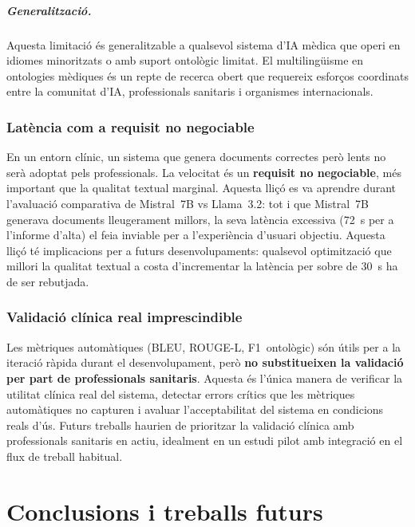 \documentclass[CAT]{TFUOC}%
\begin{document}
\paragraph{Generalització.}
Aquesta limitació és generalitzable a qualsevol sistema d'IA mèdica que operi en idiomes minoritzats o amb suport ontològic limitat. El multilingüisme en ontologies mèdiques és un repte de recerca obert que requereix esforços coordinats entre la comunitat d'IA, professionals sanitaris i organismes internacionals.

\subsection{Latència com a requisit no negociable}

En un entorn clínic, un sistema que genera documents correctes però lents no serà adoptat pels professionals. La velocitat és un \textbf{requisit no negociable}, més important que la qualitat textual marginal. Aquesta lliçó es va aprendre durant l'avaluació comparativa de Mistral~7B vs Llama~3.2: tot i que Mistral~7B generava documents lleugerament millors, la seva latència excessiva (72~s per a l'informe d'alta) el feia inviable per a l'experiència d'usuari objectiu. Aquesta lliçó té implicacions per a futurs desenvolupaments: qualsevol optimització que millori la qualitat textual a costa d'incrementar la latència per sobre de 30~s ha de ser rebutjada.

\subsection{Validació clínica real imprescindible}

Les mètriques automàtiques (BLEU, ROUGE-L, F1~ontològic) són útils per a la iteració ràpida durant el desenvolupament, però \textbf{no substitueixen la validació per part de professionals sanitaris}. Aquesta és l'única manera de verificar la utilitat clínica real del sistema, detectar errors crítics que les mètriques automàtiques no capturen i avaluar l'acceptabilitat del sistema en condicions reals d'ús. Futurs treballs haurien de prioritzar la validació clínica amb professionals sanitaris en actiu, idealment en un estudi pilot amb integració en el flux de treball habitual.

\chapter{Conclusions i treballs futurs}
\end{document}
